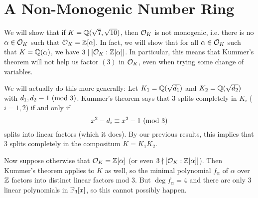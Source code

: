 \section{A Non-Monogenic Number Ring}
\begin{remark}
  We will show that if $K = \mathbb{Q}(\sqrt{7}, \sqrt{10})$,
  then $\mathcal{O}_K$ is not monogenic, i.e. there is
  no $\alpha \in \mathcal{O}_K$ such that $\mathcal{O}_K = \mathbb{Z}[\alpha]$.
  In fact, we will show that for all $\alpha \in \mathcal{O}_K$
  such that $K = \mathbb{Q}(\alpha)$, we have
  $3 \mid [\mathcal{O}_K : \mathbb{Z}[\alpha]]$. In particular, this
  means that Kummer's theorem will not help us factor
  $(3)$ in $\mathcal{O}_K$, even when trying some change of
  variables.

  We will actually do this more generally:
  Let $K_1 = \mathbb{Q}(\sqrt{d_1})$ and $K_2 = \mathbb{Q}(\sqrt{d_2})$
  with $d_1, d_2 \equiv 1 \ (\mathrm{mod}\ 3)$. Kummer's theorem
  says that $3$ splits completely in $K_i$ ($i = 1, 2$)
  if and only if
  \[x^2 - d_i \equiv x^2 - 1 \ (\mathrm{mod}\ 3)\]
  splits into linear factors (which it does). By our
  previous results, this
  implies that $3$ splits completely in the compositum
  $K = K_1 K_2$.

  Now suppose otherwise that $\mathcal{O}_K = \mathbb{Z}[\alpha]$
  (or even $3 \nmid [\mathcal{O}_K : \mathbb{Z}[\alpha]]$).
  Then Kummer's theorem applies to $K$ as well, so
  the minimal polynomial $f_\alpha$ of $\alpha$
  over $\mathbb{Z}$ factors into distinct linear factors mod $3$.
  But $\deg f_{\alpha} = 4$ and there are only
  $3$ linear polynomials in $\mathbb{F}_3[x]$, so this cannot
  possibly happen.
\end{remark}

